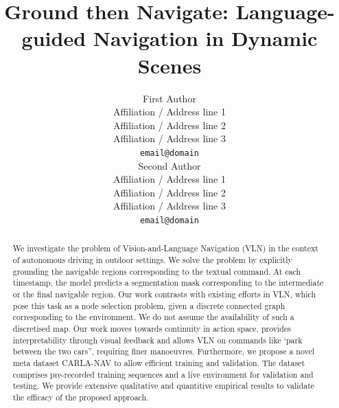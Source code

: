 \documentclass[11pt]{article}
\title{Ground then Navigate: Language-guided Navigation in Dynamic Scenes}
\author{First Author \\
  Affiliation / Address line 1 \\
  Affiliation / Address line 2 \\
  Affiliation / Address line 3 \\
  \texttt{email@domain} \\\And
  Second Author \\
  Affiliation / Address line 1 \\
  Affiliation / Address line 2 \\
  Affiliation / Address line 3 \\
  \texttt{email@domain} \\}
\begin{document}
\maketitle
\begin{abstract}
We investigate the problem of Vision-and-Language Navigation (VLN) in the context of autonomous driving in outdoor settings. We solve the problem by explicitly grounding the navigable regions corresponding to the textual command. At each timestamp, the model predicts a segmentation mask corresponding to the intermediate or the final navigable region. Our work contrasts with existing efforts in VLN, which pose this task as a node selection problem, given a discrete connected graph corresponding to the environment. We do not assume the availability of such a discretised map. Our work moves towards continuity in action space, provides interpretability through visual feedback and allows VLN on commands like `park between the two cars”, requiring finer manoeuvres. Furthermore, we propose a novel meta dataset CARLA-NAV to allow efficient training and validation. The dataset comprises pre-recorded training sequences and a live environment for validation and testing. We provide extensive qualitative and quantitive empirical results to validate the efficacy of the proposed approach.
\end{abstract}
\end{document}
